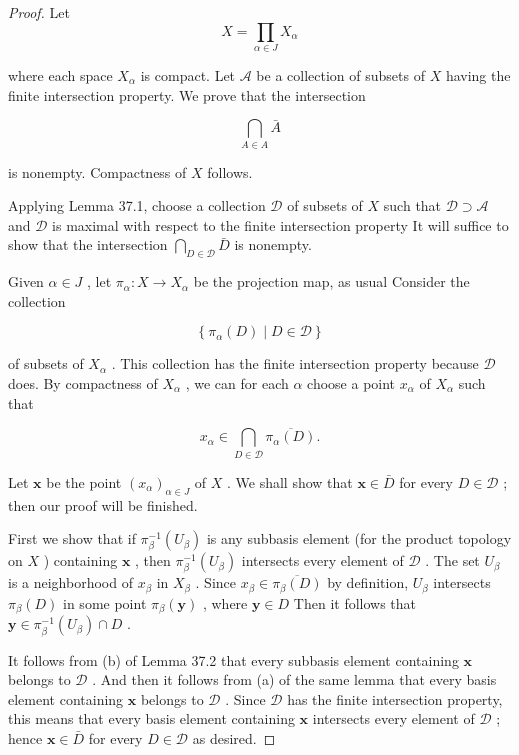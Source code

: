 \begin{proof}Let
\[
X = \mathop{\prod }\limits_{{\alpha  \in  J}}{X}_{\alpha }
\]

where each space \({X}_{\alpha }\) is compact. Let \(\mathcal{A}\) be a collection of subsets of \(X\) having the finite intersection property. We prove that the intersection

\[
\mathop{\bigcap }\limits_{{A \in  A}}\bar{A}
\]

is nonempty. Compactness of \(X\) follows.

Applying Lemma 37.1, choose a collection \(\mathcal{D}\) of subsets of \(X\) such that \(\mathcal{D} \supset  \mathcal{A}\) and \(\mathcal{D}\) is maximal with respect to the finite intersection property It will suffice to show that the intersection \(\mathop{\bigcap }\limits_{{D \in  \mathcal{D}}}\bar{D}\) is nonempty.

Given \(\alpha  \in  J\) , let \({\pi }_{\alpha } : X \rightarrow  {X}_{\alpha }\) be the projection map, as usual Consider the collection

\[
\left\{  {{\pi }_{\alpha }\left( D\right)  \mid  D \in  \mathcal{D}}\right\}
\]

of subsets of \({X}_{\alpha }\) . This collection has the finite intersection property because \(\mathcal{D}\) does. By compactness of \({X}_{\alpha }\) , we can for each \(\alpha\) choose a point \({x}_{\alpha }\) of \({X}_{\alpha }\) such that

\[
{x}_{\alpha } \in  \mathop{\bigcap }\limits_{{D \in  \mathcal{D}}}\overline{{\pi }_{\alpha }\left( D\right) }.
\]

Let \(\mathbf{x}\) be the point \({\left( {x}_{\alpha }\right) }_{\alpha  \in  J}\) of \(X\) . We shall show that \(\mathbf{x} \in  \bar{D}\) for every \(D \in  \mathcal{D}\) ; then our proof will be finished.

First we show that if \({\pi }_{\beta }^{-1}\left( {U}_{\beta }\right)\) is any subbasis element (for the product topology on \(X\) ) containing \(\mathbf{x}\) , then \({\pi }_{\beta }^{-1}\left( {U}_{\beta }\right)\) intersects every element of \(\mathcal{D}\) . The set \({U}_{\beta }\) is a neighborhood of \({x}_{\beta }\) in \({X}_{\beta }\) . Since \({x}_{\beta } \in  \overline{{\pi }_{\beta }\left( D\right) }\) by definition, \({U}_{\beta }\) intersects \({\pi }_{\beta }\left( D\right)\) in some point \({\pi }_{\beta }\left( \mathbf{y}\right)\) , where \(\mathbf{y} \in  D\) Then it follows that \(\mathbf{y} \in  {\pi }_{\beta }^{-1}\left( {U}_{\beta }\right)  \cap  D\) .

It follows from (b) of Lemma 37.2 that every subbasis element containing \(\mathbf{x}\) belongs to \(\mathcal{D}\) . And then it follows from (a) of the same lemma that every basis element containing \(\mathbf{x}\) belongs to \(\mathcal{D}\) . Since \(\mathcal{D}\) has the finite intersection property, this means that every basis element containing \(\mathbf{x}\) intersects every element of \(\mathcal{D}\) ; hence \(\mathbf{x} \in  \bar{D}\) for every \(D \in  \mathcal{D}\) as desired.
\end{proof}
